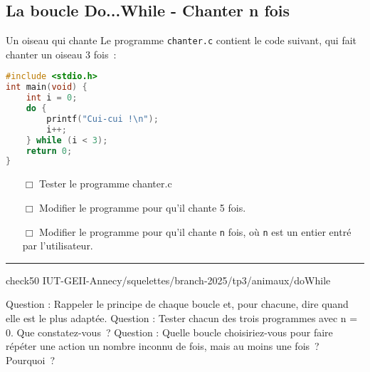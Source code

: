 \subsection{La boucle Do...While - Chanter n fois}

\begin{UPSTIManipulation}{Un oiseau qui chante}
	Le programme \texttt{chanter.c} contient le code suivant, qui fait chanter un oiseau 3 fois :
	\begin{lstlisting}[language=c]
#include <stdio.h>
int main(void) {
    int i = 0;
    do {
        printf("Cui-cui !\n");
        i++;
    } while (i < 3);
    return 0;
}
\end{lstlisting}
	\begin{itemize}
		\item[$\Box$] Tester le programme chanter.c
		\item[$\Box$] Modifier le programme pour qu'il chante 5 fois.
		\item[$\Box$] Modifier le programme pour qu'il chante \texttt{n} fois, où \texttt{n} est un entier entré par l'utilisateur.
	\end{itemize}
	\hrule
	check50 IUT-GEII-Annecy/squelettes/branch-2025/tp3/animaux/doWhile
\end{UPSTIManipulation}

Question : Rappeler le principe de chaque boucle et, pour chacune, dire quand elle est le plus adaptée.
Question : Tester chacun des trois programmes avec n = 0. Que constatez-vous ?
Question : Quelle boucle choisiriez-vous pour faire répéter une action un nombre inconnu de fois, mais au moins une fois ? Pourquoi ?